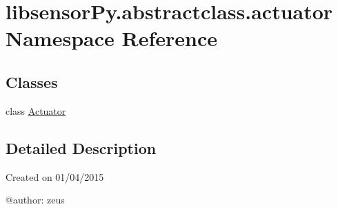 \hypertarget{namespacelibsensorPy_1_1abstractclass_1_1actuator}{}\section{libsensor\+Py.\+abstractclass.\+actuator Namespace Reference}
\label{namespacelibsensorPy_1_1abstractclass_1_1actuator}
\subsection*{Classes}
\begin{DoxyCompactItemize}
\item 
class \hyperlink{classlibsensorPy_1_1abstractclass_1_1actuator_1_1Actuator}{Actuator}
\end{DoxyCompactItemize}


\subsection{Detailed Description}
\begin{DoxyVerb}Created on 01/04/2015

@author: zeus
\end{DoxyVerb}
 